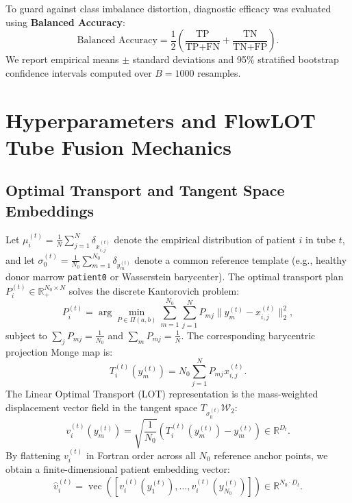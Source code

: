 \documentclass[10pt,journal,compsoc]{IEEEtran}
\begin{document}
To guard against class imbalance distortion, diagnostic efficacy was evaluated using \textbf{Balanced Accuracy}:
\begin{equation}
    \text{Balanced Accuracy} = \frac{1}{2} \left( \frac{\text{TP}}{\text{TP} + \text{FN}} + \frac{\text{TN}}{\text{TN} + \text{FP}} \right).
\end{equation}
We report empirical means $\pm$ standard deviations and 95\% stratified bootstrap confidence intervals computed over $B=1000$ resamples.

\section{Hyperparameters and FlowLOT Tube Fusion Mechanics}

\subsection{Optimal Transport and Tangent Space Embeddings}
Let $\mu_i^{(t)} = \frac{1}{N} \sum_{j=1}^N \delta_{x_{i,j}^{(t)}}$ denote the empirical distribution of patient $i$ in tube $t$, and let $\sigma_0^{(t)} = \frac{1}{N_0} \sum_{m=1}^{N_0} \delta_{y_m^{(t)}}$ denote a common reference template (e.g., healthy donor marrow \texttt{patient0} or Wasserstein barycenter). The optimal transport plan $P_{i}^{(t)} \in \mathbb{R}_{+}^{N_0 \times N}$ solves the discrete Kantorovich problem:
\begin{equation}
    P_{i}^{(t)} = \arg\min_{P \in \Pi(a, b)} \sum_{m=1}^{N_0} \sum_{j=1}^N P_{mj} \| y_m^{(t)} - x_{i,j}^{(t)} \|_2^2,
\end{equation}
subject to $\sum_{j} P_{mj} = \frac{1}{N_0}$ and $\sum_{m} P_{mj} = \frac{1}{N}$. The corresponding barycentric projection Monge map is:
\begin{equation}
    T_i^{(t)}(y_m^{(t)}) = N_0 \sum_{j=1}^N P_{mj} x_{i,j}^{(t)}.
\end{equation}
The Linear Optimal Transport (LOT) representation is the mass-weighted displacement vector field in the tangent space $T_{\sigma_0^{(t)}}\mathcal{W}_2$:
\begin{equation}
    v_i^{(t)}(y_m^{(t)}) = \sqrt{\frac{1}{N_0}} \left( T_i^{(t)}(y_m^{(t)}) - y_m^{(t)} \right) \in \mathbb{R}^{D_t}.
\end{equation}
By flattening $v_i^{(t)}$ in Fortran order across all $N_0$ reference anchor points, we obtain a finite-dimensional patient embedding vector:
\begin{equation}
    \hat{v}_i^{(t)} = \operatorname{vec}\left( [v_i^{(t)}(y_1^{(t)}), \dots, v_i^{(t)}(y_{N_0}^{(t)})] \right) \in \mathbb{R}^{N_0 \cdot D_t}.
\end{equation}
\end{document}
